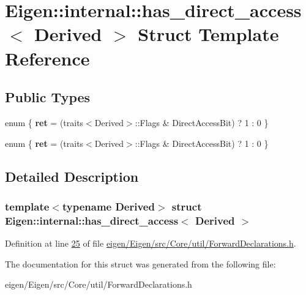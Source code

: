 \hypertarget{struct_eigen_1_1internal_1_1has__direct__access}{}\section{Eigen\+:\+:internal\+:\+:has\+\_\+direct\+\_\+access$<$ Derived $>$ Struct Template Reference}
\label{struct_eigen_1_1internal_1_1has__direct__access}
\subsection*{Public Types}
\begin{DoxyCompactItemize}
\item 
\mbox{\label{struct_eigen_1_1internal_1_1has__direct__access_a0ec8f51f6a4d8ecc4d4e1b88c66a3f26}} 
enum \{ {\bfseries ret} = (traits$<$Derived$>$\+:\+:Flags \& Direct\+Access\+Bit) ? 1 \+: 0
 \}
\item 
\mbox{\label{struct_eigen_1_1internal_1_1has__direct__access_a3ac409d511b3b9f7a143bd5b6302543c}} 
enum \{ {\bfseries ret} = (traits$<$Derived$>$\+:\+:Flags \& Direct\+Access\+Bit) ? 1 \+: 0
 \}
\end{DoxyCompactItemize}


\subsection{Detailed Description}
\subsubsection*{template$<$typename Derived$>$\newline
struct Eigen\+::internal\+::has\+\_\+direct\+\_\+access$<$ Derived $>$}



Definition at line \hyperlink{eigen_2_eigen_2src_2_core_2util_2_forward_declarations_8h_source_l00025}{25} of file \hyperlink{eigen_2_eigen_2src_2_core_2util_2_forward_declarations_8h_source}{eigen/\+Eigen/src/\+Core/util/\+Forward\+Declarations.\+h}.



The documentation for this struct was generated from the following file\+:\begin{DoxyCompactItemize}
\item 
eigen/\+Eigen/src/\+Core/util/\+Forward\+Declarations.\+h\end{DoxyCompactItemize}
